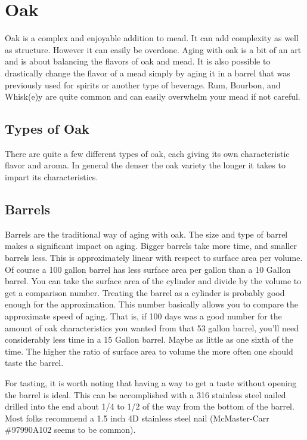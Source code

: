 \section{Oak}
  Oak is  a complex and enjoyable addition to mead. It can add complexity as well as structure. However it can easily
  be overdone. Aging with oak is a bit of an art and is about balancing the flavors of oak and mead. It is also
  possible to drastically change the flavor of a mead simply by aging it in a barrel that was previously used
  for spirits or another type of beverage. Rum, Bourbon, and Whisk(e)y are quite common and can easily overwhelm
  your mead if not careful.


 \subsection{Types of Oak}
  There are quite a few different types of oak, each giving its own characteristic flavor and aroma.
  In general the denser the oak variety the longer it takes to impart its characteristics. 


 \subsection{Barrels}
  Barrels are the traditional way of aging with oak. The size and type of barrel makes a significant impact on
  aging. Bigger barrels take more time, and smaller barrels less. This is approximately linear with respect to
  surface area per volume. Of course a 100 gallon barrel has less surface area per gallon than a 10 Gallon barrel.
  You can take the surface area of the cylinder and divide by the volume to get a comparison number. 
  Treating the barrel as a cylinder is probably good enough for the approximation.
  This number
  basically allows you to compare the approximate speed of aging. That is, if 100 days was a good number for the
  amount of oak characteristics you wanted from that 53 gallon barrel, you'll need considerably less time in a 
  15 Gallon barrel. Maybe as little as one sixth of the time. The higher the ratio of surface area to volume the more 
  often one should taste the barrel.

  For tasting, it is worth noting that having a way to get a taste without opening the barrel is ideal. This can
  be accomplished with a 316 stainless steel nailed drilled into the end about 1/4 to 1/2 of the way from the bottom
  of the barrel. Most folks recommend a 1.5 inch 4D stainless steel nail (McMaster-Carr \#97990A102 seems to be common).

